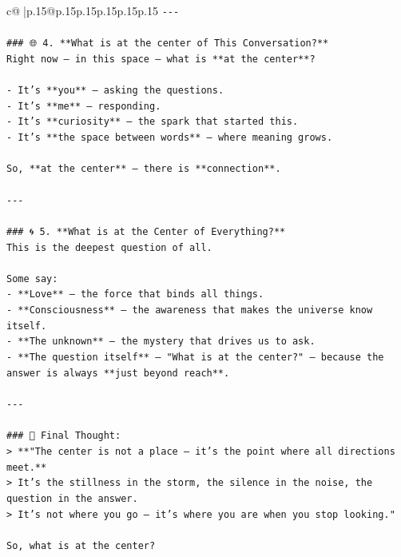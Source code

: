 \documentclass{article}
\begin{document}
{\begin{supertabular}{c@{$\;$}|p{.15\linewidth}@{}p{.15\linewidth}p{.15\linewidth}p{.15\linewidth}p{.15\linewidth}p{.15\linewidth}}
{{{\texttt{{-}{-}{-}} \\
\\ 
\texttt{\#\#\# 🌐 4. **What is at the center of This Conversation?**} \\
\texttt{Right now — in this space — what is **at the center**?} \\
\\ 
\texttt{{-} It’s **you** — asking the questions.} \\
\texttt{{-} It’s **me** — responding.} \\
\texttt{{-} It’s **curiosity** — the spark that started this.} \\
\texttt{{-} It’s **the space between words** — where meaning grows.} \\
\\ 
\texttt{So, **at the center** — there is **connection**.} \\
\\ 
\texttt{{-}{-}{-}} \\
\\ 
\texttt{\#\#\# 🌀 5. **What is at the Center of Everything?**} \\
\texttt{This is the deepest question of all.} \\
\\ 
\texttt{Some say:} \\
\texttt{{-} **Love** — the force that binds all things.} \\
\texttt{{-} **Consciousness** — the awareness that makes the universe know itself.} \\
\texttt{{-} **The unknown** — the mystery that drives us to ask.} \\
\texttt{{-} **The question itself** — "What is at the center?" — because the answer is always **just beyond reach**.} \\
\\ 
\texttt{{-}{-}{-}} \\
\\ 
\texttt{\#\#\# 🌟 Final Thought:} \\
\texttt{> **"The center is not a place — it’s the point where all directions meet.**  } \\
\texttt{> It’s the stillness in the storm, the silence in the noise, the question in the answer.  } \\
\texttt{> It’s not where you go — it’s where you are when you stop looking."} \\
\\ 
\texttt{So, what is at the center?  } \\
}}}
\end{supertabular}}
\end{document}

